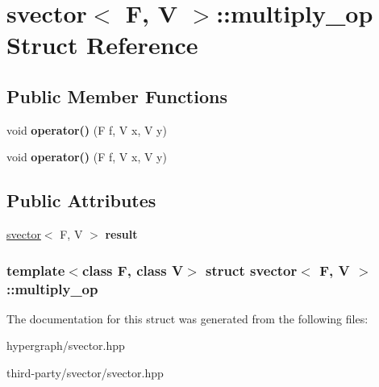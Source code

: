 \hypertarget{structsvector_1_1multiply__op}{
\section{svector$<$ F, V $>$::multiply\_\-op Struct Reference}
\label{structsvector_1_1multiply__op}
}
\subsection*{Public Member Functions}
\begin{DoxyCompactItemize}
\item 
\hypertarget{structsvector_1_1multiply__op_a710b27605bcc6af3c75098ff13430fc2}{
void {\bfseries operator()} (F f, V x, V y)}
\label{structsvector_1_1multiply__op_a710b27605bcc6af3c75098ff13430fc2}

\item 
\hypertarget{structsvector_1_1multiply__op_a710b27605bcc6af3c75098ff13430fc2}{
void {\bfseries operator()} (F f, V x, V y)}
\label{structsvector_1_1multiply__op_a710b27605bcc6af3c75098ff13430fc2}

\end{DoxyCompactItemize}
\subsection*{Public Attributes}
\begin{DoxyCompactItemize}
\item 
\hypertarget{structsvector_1_1multiply__op_a8b726798c1f02706cc6ae5c5aad9674d}{
\hyperlink{classsvector}{svector}$<$ F, V $>$ {\bfseries result}}
\label{structsvector_1_1multiply__op_a8b726798c1f02706cc6ae5c5aad9674d}

\end{DoxyCompactItemize}
\subsubsection*{template$<$class F, class V$>$ struct svector$<$ F, V $>$::multiply\_\-op}



The documentation for this struct was generated from the following files:\begin{DoxyCompactItemize}
\item 
hypergraph/svector.hpp\item 
third-\/party/svector/svector.hpp\end{DoxyCompactItemize}
